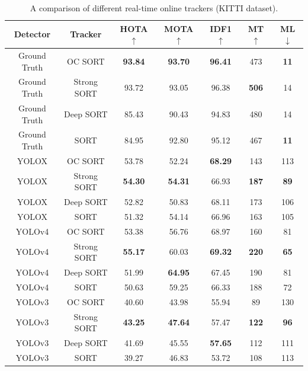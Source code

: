 \clearpage

\null
\vfill

\begin{table}[H]
\centering
{}
\begin{tabular}{ ccccccc } 
\hline
\rowcolor{gray!50}
Detector & Tracker & HOTA $\uparrow$ & MOTA $\uparrow$ & IDF1 $\uparrow$ & MT $\uparrow$ & ML $\downarrow$ \\
\hline
Ground Truth & OC SORT      &  \textbf{93.84}  &  \textbf{93.70}  & \textbf{96.41}   &  473   & \textbf{11}   \\
Ground Truth & Strong SORT  &  93.72  &  93.05  & 96.38   &  \textbf{506}   & 14   \\ 
Ground Truth & Deep SORT    &  85.43  & 90.43   &  94.83  &  480   &  14  \\ 
Ground Truth & SORT         &  84.95  &  92.80  &  95.12  &  467   &  \textbf{11}  \\ 
\hline
YOLOX & OC SORT      &  53.78  &  52.24  &  \textbf{68.29}  &  143   &  113  \\
YOLOX & Strong SORT  &  \textbf{54.30}  &  \textbf{54.31}  &  66.93  &  \textbf{187}   &  \textbf{89}  \\ 
YOLOX & Deep SORT    &  52.82  &  50.83  &  68.11  &  173   &  106  \\ 
YOLOX & SORT         &  51.32  &  54.14  &  66.96  &  163   &  105  \\ 
\hline
YOLOv4 & OC SORT      &  53.38  &  56.76  &  68.97  &  160   &  81  \\
YOLOv4 & Strong SORT  &  \textbf{55.17}  &  60.03  &  \textbf{69.32}  &  \textbf{220}   &  \textbf{65}  \\ 
YOLOv4 & Deep SORT    &  51.99  &  \textbf{64.95}  &  67.45  &  190   &  81  \\ 
YOLOv4 & SORT         &  50.63  &  59.25  &  66.33  &  188   &  72  \\ 
\hline
YOLOv3 & OC SORT      &  40.60  &  43.98  &  55.94  &  89  &  130  \\
YOLOv3 & Strong SORT  &  \textbf{43.25}  &  \textbf{47.64}  &  57.47  &  \textbf{122}  &  \textbf{96}  \\ 
YOLOv3 & Deep SORT    &  41.69  &  45.55  &  \textbf{57.65}  &  112  &  111  \\ 
YOLOv3 & SORT         &  39.27  &  46.83  &  53.72  &  108  &  113  \\ 
\hline
\end{tabular}
\caption{A comparison of different real-time online trackers (KITTI dataset).}
\label{tab.kitti}
\end{table}


